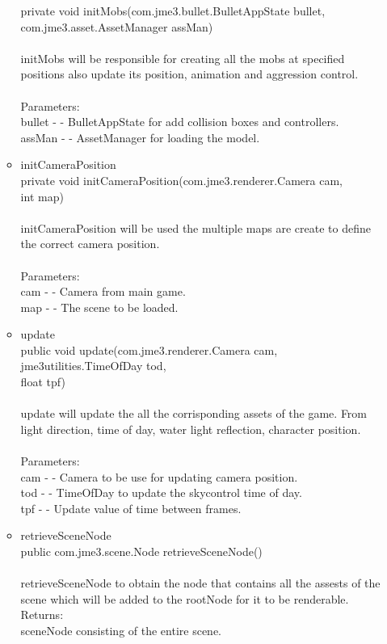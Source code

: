 \documentclass[letterpaper]{article}
\begin{document}
\begin{itemize}
\begin{itemize}
											private void initMobs(com.jme3.bullet.BulletAppState bullet, \\
		            com.jme3.asset.AssetManager assMan) \\ \\
											initMobs will be responsible for creating all the mobs at specified positions also update its position, animation and aggression control. \\ \\
											Parameters: \\
											bullet - - BulletAppState for add collision boxes and controllers. \\
											assMan - - AssetManager for loading the model.
									\item	initCameraPosition \\
											private void initCameraPosition(com.jme3.renderer.Camera cam, \\
		                      int map) \\ \\
											initCameraPosition will be used the multiple maps are create to define the correct camera position. \\ \\
											Parameters: \\
											cam - - Camera from main game. \\
											map - - The scene to be loaded.
									\item	update \\
											public void update(com.jme3.renderer.Camera cam, \\
		          jme3utilities.TimeOfDay tod, \\
		          float tpf) \\ \\
											update will update the all the corrisponding assets of the game. From light direction, time of day, water light reflection, character position. \\ \\
											Parameters: \\
											cam - - Camera to be use for updating camera position. \\
											tod - - TimeOfDay to update the skycontrol time of day. \\
											tpf - - Update value of time between frames.
									\item	retrieveSceneNode \\
											public com.jme3.scene.Node retrieveSceneNode() \\ \\
											retrieveSceneNode to obtain the node that contains all the assests of the scene which will be added to the rootNode for it to be renderable. \\
											Returns: \\
											sceneNode consisting of the entire scene.
								\end{itemize}
					\end{itemize}
				
\end{document}
